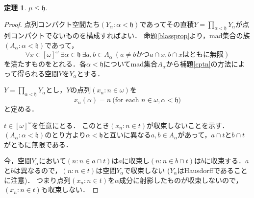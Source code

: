 \documentclass[uplatex,dvipdfmx]{jsarticle}
\newcommand{\h}{\mathfrak{h}}
\theoremstyle{definition}
\newtheorem{thm}{定理}
\theoremstyle{named}
\begin{document}
\begin{thm}
$\mu \le \h$.
\end{thm}
\begin{proof}
点列コンパクト空間たち$(Y_\alpha : \alpha < \h)$であってその直積$Y = \prod_{\alpha < \h} Y_\alpha$が点列コンパクトでないものを構成すればよい．
命題\ref{blassprop}より，mad集合の族$(A_\alpha : \alpha < \h)$であって，
\[
\forall x \in [\omega]^\omega\ \exists \alpha \in \h \ \exists a, b \in A_\alpha\ (\text{$a \ne b$かつ$a \cap x, b \cap x$はともに無限}) 
\]
を満たすものをとれる．各$\alpha < \h$についてmad集合$A_\alpha$から補題\ref{cptn}の方法によって得られる空間$Y$を$Y_\alpha$とする．

$Y = \prod_{\alpha < \h} Y_\alpha$とし，$Y$の点列$(x_n : n \in \omega)$を
\[
x_n(\alpha) = n \ \text{(for each $n \in \omega, \alpha < \h$)}
\]
と定める．

$t \in [\omega]^\omega$を任意にとる．
このとき$(x_n : n \in t)$が収束しないことを示す．
$(A_\alpha : \alpha < \h)$のとり方より$\alpha < \h$と互いに異なる$a, b \in A_\alpha$があって，$a \cap t$と$b \cap t$がともに無限である．

今，空間$Y_\alpha$において$(n : n \in a \cap t)$は$a$に収束し$(n : n \in b \cap t)$は$b$に収束する．$a$と$b$は異なるので，$(n : n \in t)$は空間$Y_\alpha$で収束しない ($Y_\alpha$はHausdorffであることに注意)．
つまり点列$(x_n : n \in t)$を$\alpha$成分に射影したものが収束しないので，$(x_n : n \in t)$も収束しない．
\end{proof}

\nocite{*}
\printbibliography[title=参考文献]
\end{document}
